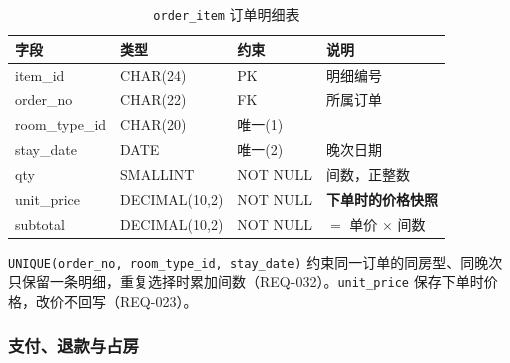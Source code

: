 \begin{table}[H]
\centering
\caption{\texttt{order\_item} 订单明细表}
\tabfont
\begin{tabularx}{\textwidth}{@{}L{3.0cm}L{3.0cm}L{3.2cm}X@{}}
\toprule
字段 & 类型 & 约束 & 说明 \\
\midrule
item\_id & CHAR(24) & PK & 明细编号 \\
order\_no & CHAR(22) & FK & 所属订单 \\
room\_type\_id & CHAR(20) & 唯一(1) & \\
stay\_date & DATE & 唯一(2) & 晚次日期 \\
qty & SMALLINT & NOT NULL & 间数，正整数 \\
unit\_price & DECIMAL(10,2) & NOT NULL & \textbf{下单时的价格快照} \\
subtotal & DECIMAL(10,2) & NOT NULL & $=$ 单价 $\times$ 间数 \\
\bottomrule
\end{tabularx}
\end{table}

\texttt{UNIQUE(order\_no, room\_type\_id, stay\_date)} 约束同一订单的同房型、同晚次只保留一条明细，重复选择时累加间数（REQ-032）。\texttt{unit\_price} 保存下单时价格，改价不回写（REQ-023）。

\subsubsection{支付、退款与占房}

